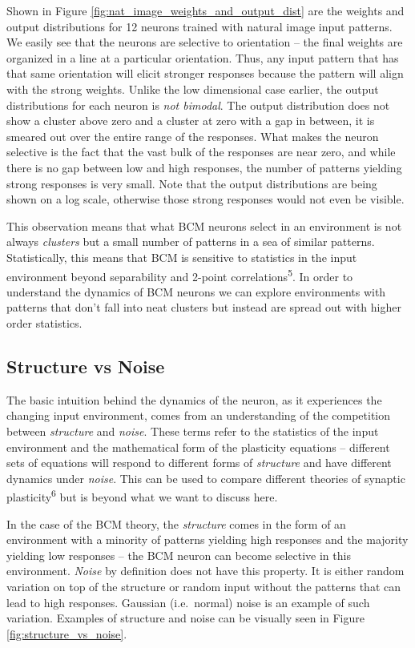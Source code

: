 \documentclass[
]{article}
\begin{document}
Shown in Figure \ref{fig:nat_image_weights_and_output_dist} are the
weights and output distributions for 12 neurons trained with natural
image input patterns. We easily see that the neurons are selective to
orientation -- the final weights are organized in a line at a particular
orientation. Thus, any input pattern that has that same orientation will
elicit stronger responses because the pattern will align with the strong
weights. Unlike the low dimensional case earlier, the output
distributions for each neuron is \emph{not bimodal}. The output
distribution does not show a cluster above zero and a cluster at zero
with a gap in between, it is smeared out over the entire range of the
responses. What makes the neuron selective is the fact that the vast
bulk of the responses are near zero, and while there is no gap between
low and high responses, the number of patterns yielding strong responses
is very small. Note that the output distributions are being shown on a
log scale, otherwise those strong responses would not even be visible.

This observation means that what BCM neurons select in an environment is
not always \emph{clusters} but a small number of patterns in a sea of
similar patterns. Statistically, this means that BCM is sensitive to
statistics in the input environment beyond separability and 2-point
correlations\textsuperscript{5}. In order to understand the dynamics of
BCM neurons we can explore environments with patterns that don't fall
into neat clusters but instead are spread out with higher order
statistics.

\subsection{Structure vs Noise}\label{sec:structure-vs-noise}

The basic intuition behind the dynamics of the neuron, as it experiences
the changing input environment, comes from an understanding of the
competition between \emph{structure} and \emph{noise}. These terms refer
to the statistics of the input environment and the mathematical form of
the plasticity equations -- different sets of equations will respond to
different forms of \emph{structure} and have different dynamics under
\emph{noise}. This can be used to compare different theories of synaptic
plasticity\textsuperscript{6} but is beyond what we want to discuss
here.

In the case of the BCM theory, the \emph{structure} comes in the form of
an environment with a minority of patterns yielding high responses and
the majority yielding low responses -- the BCM neuron can become
selective in this environment. \emph{Noise} by definition does not have
this property. It is either random variation on top of the structure or
random input without the patterns that can lead to high responses.
Gaussian (i.e.~normal) noise is an example of such variation. Examples
of structure and noise can be visually seen in Figure
\ref{fig:structure_vs_noise}.
\end{document}
